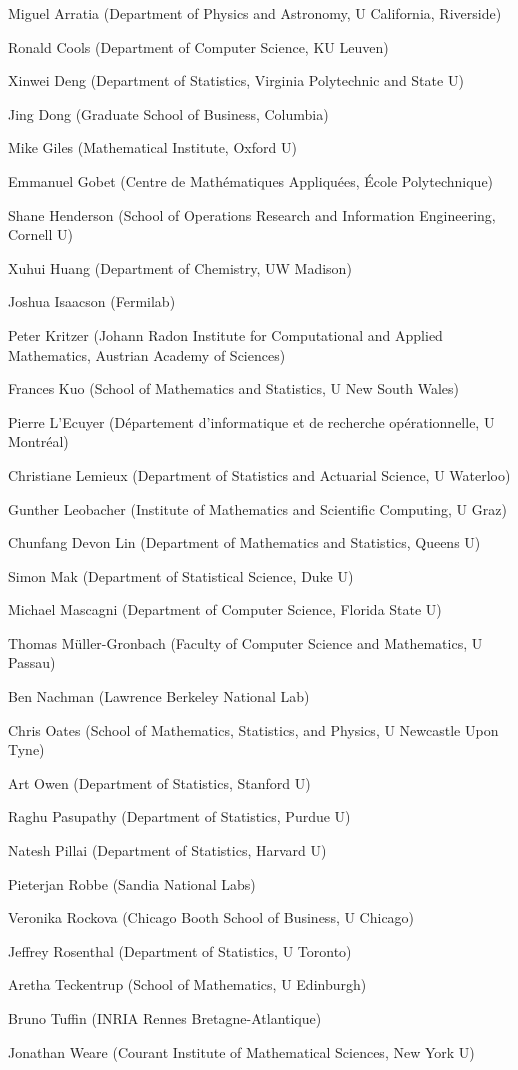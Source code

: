 \setlength{\columnsep}{1cm}
\begin{multicols}{2}
\raggedright
Miguel Arratia (Department of Physics and Astronomy, U California, Riverside)

Ronald Cools (Department of Computer Science, KU Leuven)

Xinwei Deng (Department of Statistics, Virginia Polytechnic and State U)

Jing Dong (Graduate School of Business, Columbia)

Mike Giles (Mathematical Institute, Oxford U)

Emmanuel Gobet (Centre de Mathématiques Appliquées, École Polytechnique)

Shane Henderson (School of Operations Research and Information Engineering, Cornell U)

Xuhui Huang (Department of Chemistry, UW Madison)

Joshua Isaacson (Fermilab)

Peter Kritzer (Johann Radon Institute for Computational and Applied Mathematics, Austrian Academy of Sciences)

Frances Kuo (School of Mathematics and Statistics, U New South Wales)

Pierre L'Ecuyer (Département d'informatique et de recherche opérationnelle, U Montréal)

Christiane Lemieux (Department of Statistics and Actuarial Science, U Waterloo)

Gunther Leobacher (Institute of Mathematics and Scientific Computing, U Graz)

Chunfang Devon Lin (Department of Mathematics and Statistics, Queens U)

Simon Mak (Department of Statistical Science, Duke U)

Michael Mascagni (Department of Computer Science, Florida State U)

Thomas Müller-Gronbach (Faculty of Computer Science and Mathematics, U Passau)

Ben Nachman (Lawrence Berkeley National Lab)

Chris Oates (School of Mathematics, Statistics, and Physics, U Newcastle Upon Tyne)

Art Owen (Department of Statistics, Stanford U)

Raghu Pasupathy (Department of Statistics, Purdue U)

Natesh Pillai (Department of Statistics, Harvard U)

Pieterjan Robbe (Sandia National Labs)

Veronika Rockova (Chicago Booth School of Business, U Chicago)

Jeffrey Rosenthal (Department of Statistics, U Toronto)

Aretha Teckentrup (School of Mathematics, U Edinburgh)

Bruno Tuffin (INRIA Rennes Bretagne-Atlantique)

Jonathan Weare (Courant Institute of Mathematical Sciences, New York U)

\end{multicols}



